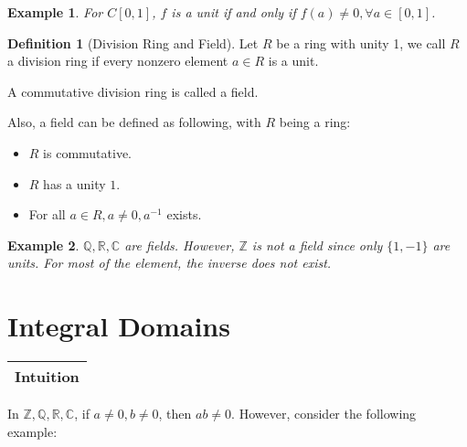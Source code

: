 \documentclass{article}
\theoremstyle{MyNonumberplain}
\theoremstyle{break}
\theoremstyle{break}
\newtheorem{example}{Example}[section]
\theoremstyle{break}
\theoremstyle{definition}
\theoremstyle{break}
\newtheorem{definition}{Definition}[section]
\begin{document}
\begin{expbox}
    \begin{example}
        For $C [0, 1]$, $f$ is a unit if and only if $f (a) \neq 0, \forall a \in [0, 1]$.
    \end{example}
\end{expbox}

\begin{defbox}
    \begin{definition}[Division Ring and Field]
        Let $R$ be a ring with unity 1, we call $R$ a division ring if every nonzero
        element $a \in R$ is a unit.\bigskip
        
        A commutative division ring is called a field.\bigskip
        
        Also, a field can be defined as following, with $R$ being a ring:\bigskip
        \begin{itemize}
          \item $R$ is commutative.\bigskip
          
          \item $R$ has a unity $1$.\bigskip
          
          \item For all $a \in R, a \neq 0, a^{- 1}$ exists.
        \end{itemize}
    \end{definition}
\end{defbox}

\begin{expbox}
    \begin{example}
        $\mathbb{Q}, \mathbb{R}, \mathbb{C}$ are fields. However, $\mathbb{Z}$ is not a field since only $\{1,-1\}$ are units. For most of the element, the inverse does not exist.
    \end{example}
\end{expbox}

\newpage

\section{Integral Domains}

\begin{tabular}{|c|}
    \hline
    Intuition\\
    \hline
  \end{tabular}
  
  In $\mathbb{Z}, \mathbb{Q}, \mathbb{R}, \mathbb{C}$, if $a \neq 0, b \neq 0$,
  then $a b \neq 0$. However, consider the following example:
  
\end{document}

